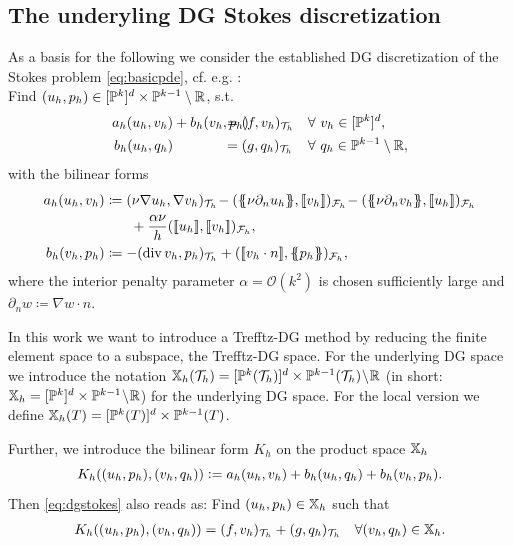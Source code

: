 \documentclass[sn-mathphys,Numbered]{sn-jnl}%
\theoremstyle{remark}%
\theoremstyle{definition}%
\begin{document}
\subsection{The underyling DG Stokes discretization}
As a basis for the following we consider the established DG discretization of the Stokes problem \eqref{eq:basicpde}, cf. e.g. \cite[Section 6.1.5]{di2011mathematical}: \\
Find $(u_h, p_h) \in [\mathbb{P}^k]^d \times \mathbb{P}^{k-1}\setminus \mathbb{R}$, s.t.
\begin{subequations}\label{eq:dgstokes}
\begin{align}
a_h(u_h,v_h) &+ b_h(v_h,p_h) &\hspace*{-1cm}&= (f,v_h)_{\Th} && \forall ~ v_h \in [\PP^k]^d,\\
  b_h(u_h,q_h) &  &\hspace*{-1cm}&= (g,q_h)_{\Th} && \forall ~ q_h \in \PP^{k-1}\setminus \RR,
  \end{align}
\end{subequations}
with the bilinear forms
\begin{align*}
  a_h(u_h,v_h) &\coloneqq (\nu\! \Grad\! u_h,\Grad\! v_h)_\Th\! - (\avg{ \nu \partial_n u_h },\jmp{v_h})_\Fh\! - (\avg{\nu \partial_n v_h},\jmp{u_h})_\Fh  \\ & \qquad \!+ \frac{\alpha \nu }{h} (\jmp{u_h},\jmp{v_h})_\Fh, \\ 
b_h(v_h,p_h) &\coloneqq -(\Div v_h, p_h)_{\Th} + (\jmp{v_h \cdot n}, \avg{p_h})_{\Fh},
\end{align*}
where the interior penalty parameter $\alpha = \mathcal{O}(k^2)$ is chosen sufficiently large and $\partial_n w \coloneqq \nabla w \cdot n$.

In this work we want to introduce a Trefftz-DG method by reducing the finite element space to a 
subspace, the Trefftz-DG space. For the underlying DG space we introduce the
notation $\mathbb{X}_h({\mathcal{T}_h}) = [\mathbb{P}^k({\mathcal{T}_h})]^d \times \mathbb{P}^{k-1}({\mathcal{T}_h}) \!\setminus\! \mathbb{R}$
(in short: $\mathbb{X}_h = [\mathbb{P}^k]^d \times \mathbb{P}^{k-1} \!\setminus\! \mathbb{R}$) for the
underlying DG space. For the local version we define $\mathbb{X}_h(T) = [\mathbb{P}^k(T)]^d \times \mathbb{P}^{k-1}(T)$.

Further, we introduce the bilinear form $K_h$ on the product space $\mathbb{X}_h$
\begin{equation} \label{eq:K}
  K_h((u_h,p_h),(v_h,q_h)) := a_h(u_h,v_h) + b_h(u_h,q_h) + b_h(v_h,p_h).
\end{equation}
Then \eqref{eq:dgstokes} also reads as: Find $(u_h,p_h) \in \mathbb{X}_h$ such that
\begin{align} \label{eq:DGK}
  K_h((u_h,p_h),(v_h,q_h)) = (f,v_h)_{{\mathcal{T}_h}} + (g,q_h)_{{\mathcal{T}_h}} \quad \forall (v_h,q_h) \in \mathbb{X}_h.
\end{align}
\end{document}
